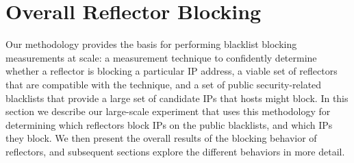 \section{Overall Reflector Blocking}
\label{sec:perfect-blocking}

Our methodology provides the basis for performing blacklist blocking
measurements at scale: a measurement technique to confidently
determine whether a reflector is blocking a particular IP address, a
viable set of reflectors that are compatible with the technique, and a
set of public security-related blacklists that provide a large set of
candidate IPs that hosts might block.  In this section we describe our
large-scale experiment that uses this methodology for determining
which reflectors block IPs on the public blacklists, and which IPs
they block.  We then present the overall results of the blocking
behavior of reflectors, and subsequent sections explore the different
behaviors in more detail.




